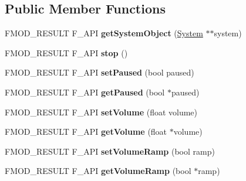 \subsection*{Public Member Functions}
\begin{DoxyCompactItemize}
\item 
\mbox{\label{classFMOD_1_1ChannelControl_a8364d9a55bf85d03de5813f17a074e5a}} 
F\+M\+O\+D\+\_\+\+R\+E\+S\+U\+LT F\+\_\+\+A\+PI {\bfseries get\+System\+Object} (\hyperlink{classFMOD_1_1System}{System} $\ast$$\ast$system)
\item 
\mbox{\label{classFMOD_1_1ChannelControl_a5eb6a02a08058a217a9149b5f9051b51}} 
F\+M\+O\+D\+\_\+\+R\+E\+S\+U\+LT F\+\_\+\+A\+PI {\bfseries stop} ()
\item 
\mbox{\label{classFMOD_1_1ChannelControl_a648b799ac7258df17d2a9aa362561aa2}} 
F\+M\+O\+D\+\_\+\+R\+E\+S\+U\+LT F\+\_\+\+A\+PI {\bfseries set\+Paused} (bool paused)
\item 
\mbox{\label{classFMOD_1_1ChannelControl_a8e1963bd761bf482e10a6a9835bcfdd2}} 
F\+M\+O\+D\+\_\+\+R\+E\+S\+U\+LT F\+\_\+\+A\+PI {\bfseries get\+Paused} (bool $\ast$paused)
\item 
\mbox{\label{classFMOD_1_1ChannelControl_a614531fff4b8be9646c9d34c13a6317a}} 
F\+M\+O\+D\+\_\+\+R\+E\+S\+U\+LT F\+\_\+\+A\+PI {\bfseries set\+Volume} (float volume)
\item 
\mbox{\label{classFMOD_1_1ChannelControl_a5e3d159d6bef6714d585f52b2b98de2e}} 
F\+M\+O\+D\+\_\+\+R\+E\+S\+U\+LT F\+\_\+\+A\+PI {\bfseries get\+Volume} (float $\ast$volume)
\item 
\mbox{\label{classFMOD_1_1ChannelControl_a9b0d1fdd0f1b7e5a36bc52db635937ce}} 
F\+M\+O\+D\+\_\+\+R\+E\+S\+U\+LT F\+\_\+\+A\+PI {\bfseries set\+Volume\+Ramp} (bool ramp)
\item 
\mbox{\label{classFMOD_1_1ChannelControl_af6d6b32fb42a65f5923663bd641a81a0}} 
F\+M\+O\+D\+\_\+\+R\+E\+S\+U\+LT F\+\_\+\+A\+PI {\bfseries get\+Volume\+Ramp} (bool $\ast$ramp)
$$
\end{DoxyCompactItemize}
